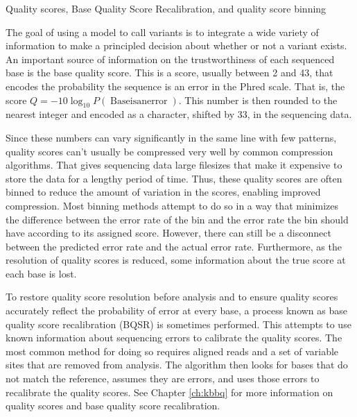 \documentclass{report}
\begin{document}
\begin{outline}
\begin{outline}
	\end{outline}
\item Quality scores, Base Quality Score Recalibration, and quality score binning
	\begin{outline}
	\item The goal of using a model to call variants is to integrate a wide variety of information to make a principled decision about whether or not a variant exists. An important source of information on the trustworthiness of each sequenced base is the base quality score. This is a score, usually between 2 and 43, that encodes the probability the sequence is an error in the Phred scale. That is, the score $Q = -10\log_{10}P(\operatorname{Base is an error})$. This number is then rounded to the nearest integer and encoded as a character, shifted by 33, in the sequencing data.
	\item Since these numbers can vary significantly in the same line with few patterns, quality scores can't usually be compressed very well by common compression algorithms. That gives sequencing data large filesizes that make it expensive to store the data for a lengthy period of time. Thus, these quality scores are often binned to reduce the amount of variation in the scores, enabling improved compression. Most binning methods attempt to do so in a way that minimizes the difference between the error rate of the bin and the error rate the bin should have according to its assigned score. However, there can still be a disconnect between the predicted error rate and the actual error rate. Furthermore, as the resolution of quality scores is reduced, some information about the true score at each base is lost.

	\item To restore quality score resolution before analysis and to ensure quality scores accurately reflect the probability of error at every base, a process known as base quality score recalibration (BQSR) is sometimes performed. This attempts to use known information about sequencing errors to calibrate the quality scores. The most common method for doing so requires aligned reads and a set of variable sites that are removed from analysis. The algorithm then looks for bases that do not match the reference, assumes they are errors, and uses those errors to recalibrate the quality scores. See Chapter \ref{ch:kbbq} for more information on quality scores and base quality score recalibration.
	

\end{outline}
\end{outline}
\end{document}
